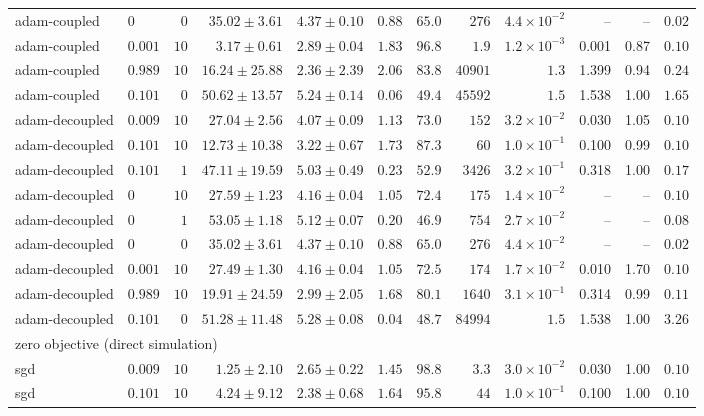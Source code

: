 \begin{tabular}{llrrrrrrrrrr}
adam-coupled & $0$ & $0$ & $35.02\pm3.61$ & $4.37\pm0.10$ & $0.88$ & $65.0$ & $276$ & $4.4\times10^{-2}$ & -- & -- & $0.02$ \\
adam-coupled & $0.001$ & $10$ & $3.17\pm0.61$ & $2.89\pm0.04$ & $1.83$ & $96.8$ & $1.9$ & $1.2\times10^{-3}$ & 0.001 & 0.87 & $0.10$ \\
adam-coupled & $0.989$ & $10$ & $16.24\pm25.88$ & $2.36\pm2.39$ & $2.06$ & $83.8$ & $40901$ & $1.3$ & 1.399 & 0.94 & $0.24$ \\
adam-coupled & $0.101$ & $0$ & $50.62\pm13.57$ & $5.24\pm0.14$ & $0.06$ & $49.4$ & $45592$ & $1.5$ & 1.538 & 1.00 & $1.65$ \\
\midrule
adam-decoupled & $0.009$ & $10$ & $27.04\pm2.56$ & $4.07\pm0.09$ & $1.13$ & $73.0$ & $152$ & $3.2\times10^{-2}$ & 0.030 & 1.05 & $0.10$ \\
adam-decoupled & $0.101$ & $10$ & $12.73\pm10.38$ & $3.22\pm0.67$ & $1.73$ & $87.3$ & $60$ & $1.0\times10^{-1}$ & 0.100 & 0.99 & $0.10$ \\
adam-decoupled & $0.101$ & $1$ & $47.11\pm19.59$ & $5.03\pm0.49$ & $0.23$ & $52.9$ & $3426$ & $3.2\times10^{-1}$ & 0.318 & 1.00 & $0.17$ \\
adam-decoupled & $0$ & $10$ & $27.59\pm1.23$ & $4.16\pm0.04$ & $1.05$ & $72.4$ & $175$ & $1.4\times10^{-2}$ & -- & -- & $0.10$ \\
adam-decoupled & $0$ & $1$ & $53.05\pm1.18$ & $5.12\pm0.07$ & $0.20$ & $46.9$ & $754$ & $2.7\times10^{-2}$ & -- & -- & $0.08$ \\
adam-decoupled & $0$ & $0$ & $35.02\pm3.61$ & $4.37\pm0.10$ & $0.88$ & $65.0$ & $276$ & $4.4\times10^{-2}$ & -- & -- & $0.02$ \\
adam-decoupled & $0.001$ & $10$ & $27.49\pm1.30$ & $4.16\pm0.04$ & $1.05$ & $72.5$ & $174$ & $1.7\times10^{-2}$ & 0.010 & 1.70 & $0.10$ \\
adam-decoupled & $0.989$ & $10$ & $19.91\pm24.59$ & $2.99\pm2.05$ & $1.68$ & $80.1$ & $1640$ & $3.1\times10^{-1}$ & 0.314 & 0.99 & $0.11$ \\
adam-decoupled & $0.101$ & $0$ & $51.28\pm11.48$ & $5.28\pm0.08$ & $0.04$ & $48.7$ & $84994$ & $1.5$ & 1.538 & 1.00 & $3.26$ \\
\midrule\multicolumn{12}{l}{zero objective (direct simulation)}\\
sgd & $0.009$ & $10$ & $1.25\pm2.10$ & $2.65\pm0.22$ & $1.45$ & $98.8$ & $3.3$ & $3.0\times10^{-2}$ & 0.030 & 1.00 & $0.10$ \\
sgd & $0.101$ & $10$ & $4.24\pm9.12$ & $2.38\pm0.68$ & $1.64$ & $95.8$ & $44$ & $1.0\times10^{-1}$ & 0.100 & 1.00 & $0.10$ \\

\end{tabular}
